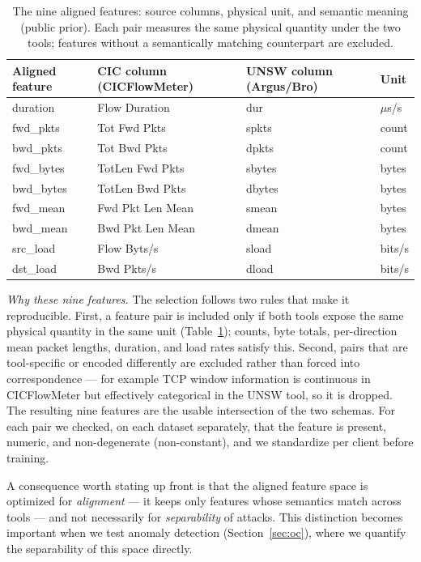 \documentclass[11pt,a4paper]{article}
\begin{document}
\begin{table}[htbp]
\centering\small
\caption{The nine aligned features: source columns, physical unit, and semantic
meaning (public prior). Each pair measures the same physical quantity under the
two tools; features without a semantically matching counterpart are excluded.}
\label{tab:align}
\begin{tabular}{@{}llll@{}}
\toprule
Aligned feature & CIC column (CICFlowMeter) & UNSW column (Argus/Bro) & Unit \\
\midrule
duration   & Flow Duration      & dur    & $\mu$s/s \\
fwd\_pkts  & Tot Fwd Pkts       & spkts  & count \\
bwd\_pkts  & Tot Bwd Pkts       & dpkts  & count \\
fwd\_bytes & TotLen Fwd Pkts    & sbytes & bytes \\
bwd\_bytes & TotLen Bwd Pkts    & dbytes & bytes \\
fwd\_mean  & Fwd Pkt Len Mean   & smean  & bytes \\
bwd\_mean  & Bwd Pkt Len Mean   & dmean  & bytes \\
src\_load  & Flow Byts/s        & sload  & bits/s \\
dst\_load  & Bwd Pkts/s         & dload  & bits/s \\
\bottomrule
\end{tabular}
\end{table}

\emph{Why these nine features.} The selection follows two rules that make it
reproducible. First, a feature pair is included only if both tools expose the same
physical quantity in the same unit (Table~\ref{tab:align}); counts, byte totals,
per-direction mean packet lengths, duration, and load rates satisfy this.
Second, pairs that are tool-specific or encoded differently are excluded rather
than forced into correspondence --- for example TCP window information is
continuous in CICFlowMeter but effectively categorical in the UNSW tool, so it is
dropped. The resulting nine features are the usable intersection of the two
schemas. For each pair we checked, on each dataset separately, that the feature is
present, numeric, and non-degenerate (non-constant), and we standardize per client
before training.

A consequence worth stating up front is that the aligned feature space is
optimized for \emph{alignment} --- it keeps only features whose semantics match
across tools --- and not necessarily for \emph{separability} of attacks. This
distinction becomes
important when we test anomaly detection (Section~\ref{sec:oc}), where we quantify
the separability of this space directly.
\end{document}
